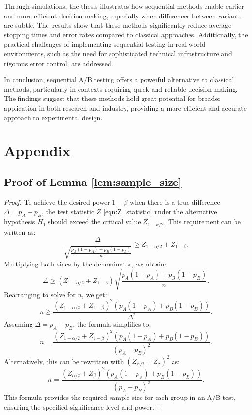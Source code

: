 \documentclass[magisterska, english]{pwr_wmat_praca_dyplomowa}
\theoremstyle{plain}
\numberwithin{theorem}{chapter}
\theoremstyle{definition}
\numberwithin{theorem}{chapter}
\begin{document}
Through simulations, the thesis illustrates how sequential methods enable earlier and more efficient decision-making, especially when differences between variants are subtle. The~results show that these methods significantly reduce average stopping times and error rates compared to classical approaches. Additionally, the practical challenges of implementing sequential testing in real-world environments, such as the need for sophisticated technical infrastructure and rigorous error control, are addressed.

In conclusion, sequential A/B testing offers a powerful alternative to classical methods, particularly in contexts requiring quick and reliable decision-making. The findings suggest that these methods hold great potential for broader application in both research and industry, providing a more efficient and accurate approach to experimental design.


\backmatter \chapter{Appendix} \label{Appendix}
\setcounter{chapter}{1}
\setcounter{section}{0}
\renewcommand{\thesection}{\Alph{chapter}.\arabic{section}}
\section{Proof of Lemma \ref{lem:sample_size}}\label{proof:sample_size}
\begin{proof}	
	To achieve the desired power \( 1-\beta \) when there is a true difference \( \Delta = p_A - p_B \), the test statistic \( Z \) \eqref{eqn:Z_statistic} under the alternative hypothesis \( H_1 \) should exceed the critical value \( Z_{1-\alpha/2} \). This requirement can be written as:
	\[
	\frac{\Delta}{\sqrt{\frac{p_A(1 - p_A) + p_B(1 - p_B)}{n}}} \geq Z_{1-\alpha/2} + Z_{1-\beta}.
	\]
	Multiplying both sides by the denominator, we obtain:
	\[
	\Delta \geq \left(Z_{1-\alpha/2} + Z_{1-\beta}\right) \sqrt{\frac{p_A(1 - p_A) + p_B(1 - p_B)}{n}}.
	\]
	Rearranging to solve for \( n \), we get:
	\[
	n \geq \frac{(Z_{1-\alpha/2} + Z_{1-\beta})^2 \left(p_A(1 - p_A) + p_B(1 - p_B)\right)}{\Delta^2}.
	\]
	Assuming \( \Delta = p_A - p_B \), the formula simplifies to:
	\[
	n = \frac{(Z_{1-\alpha/2} + Z_{1-\beta})^2 \left(p_A(1 - p_A) + p_B(1 - p_B)\right)}{(p_A - p_B)^2}.
	\]
	Alternatively, this can be rewritten with \( (Z_{\alpha/2} + Z_{\beta})^2 \) as:
	\[
	n = \frac{(Z_{\alpha/2} + Z_{\beta})^2 \left(p_A(1 - p_A) + p_B(1 - p_B)\right)}{(p_A - p_B)^2}.
	\]
	This formula provides the required sample size for each group in an A/B test, ensuring the specified significance level and power.
\end{proof}
\newpage
\end{document}
